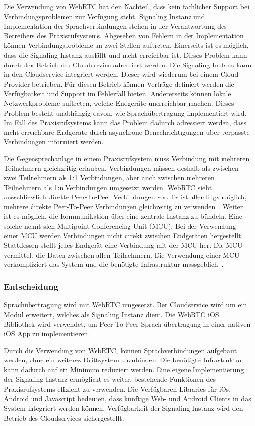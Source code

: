 Die Verwendung von WebRTC hat den Nachteil, dass kein fachlicher Support bei Verbindungsproblemen zur Verfügung steht.
Signaling Instanz und Implementation der Sprachverbindungen stehen in der Verantwortung des Betreibers des Praxisrufsystems.
Abgesehen von Fehlern in der Implementation können Verbindungsprobleme an zwei Stellen auftreten.
Einerseits ist es möglich, dass die Signaling Instanz ausfällt und nicht erreichbar ist.
Dieses Problem kann durch den Betrieb des Cloudservice adressiert werden.
Die Signaling Instanz kann in den Cloudservice integriert werden.
Dieser wird wiederum bei einem Cloud-Provider betrieben.
Für diesen Betrieb können Verträge definiert werden die Verfügbarkeit und Support im Fehlerfall bieten.
Andererseits können lokale Netzwerkprobleme auftreten, welche Endgeräte unerreichbar machen.
Dieses Problem besteht unabhängig davon, wie Sprachübertragung implementiert wird.
Im Fall des Praxisrufsystems kann das Problem dadurch adressiert werden, dass nicht erreichbare Endgeräte durch asynchrone Benachrichtigungen über verpasste Verbindungen informiert werden.

Die Gegensprechanlage in einem Praxisrufsystem muss Verbindung mit mehreren Teilnehmern gleichzeitig erlauben.
Verbindungen müssen deshalb als zwischen zwei Teilnehmern als 1:1 Verbindungen, aber auch zwischen mehreren Teilnehmern als 1:n Verbindungen umgesetzt werden.
WebRTC sieht ausschliesslich direkte Peer-To-Peer Verbindungen vor.
Es ist allerdings möglich, mehrere direkte Peer-To-Peer Verbindungen gleichzeitig zu verwenden~\cite{webrtc_mesh}.
Weiter ist es möglich, die Kommunikation über eine zentrale Instanz zu bündeln.
Eine solche nennt sich Multipoint Conferencing Unit (MCU).
Bei der Verwendung einer MCU werden Verbindungen nicht direkt zwischen Endgeräten hergestellt.
Stattdessen stellt jedes Endgerät eine Verbindung mit der MCU her.
Die MCU vermittelt die Daten zwischen allen Teilnehmern.
Die Verwendung einer MCU verkompliziert das System und die benötigte Infrastruktur massgeblich~\cite{webrtc_mcu}.

\subsubsection{Entscheidung}

Sprachübertragung wird mit WebRTC umgesetzt.
Der Cloudservice wird um ein Modul erweitert, welches als Signaling Instanz dient.
Die WebRTC iOS Bibliothek wird verwendet, um Peer-To-Peer Sprach-übertragung in einer nativen iOS App zu implementieren.

Durch die Verwendung von WebRTC, können Sprachverbindungen aufgebaut werden, ohne ein weiteres Drittsystem anzubinden.
Die benötigte Infrastruktur kann dadurch auf ein Minimum reduziert werden.
Eine eigene Implementierung der Signaling Instanz ermöglicht es weiter, bestehende Funktionen des Praxisrufsystems effizient zu verwenden.
Die Verfügbaren Libraries für iOs, Android und Javascript bedeuten, dass künftige Web- und Android Clients in das System integriert werden können.
Verfügbarkeit der Signaling Instanz wird den Betrieb des Cloudservices sichergestellt.

\clearpage
